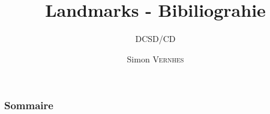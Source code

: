 \documentclass{beamer}
\title{Landmarks - Bibiliograhie}
\subtitle{\footnotesize DCSD/CD}
\author{{\Large Simon \textsc{Vernhes}}}
\institute{\textsc{{\large Onera}}}
\date{\oldstylenums{\today}}
\begin{document}
	\begin{frame}
		\titlepage
	\end{frame}

	\begin{frame}
		\frametitle{Sommaire}
		\small \tableofcontents
	\end{frame}

  
\end{document}
